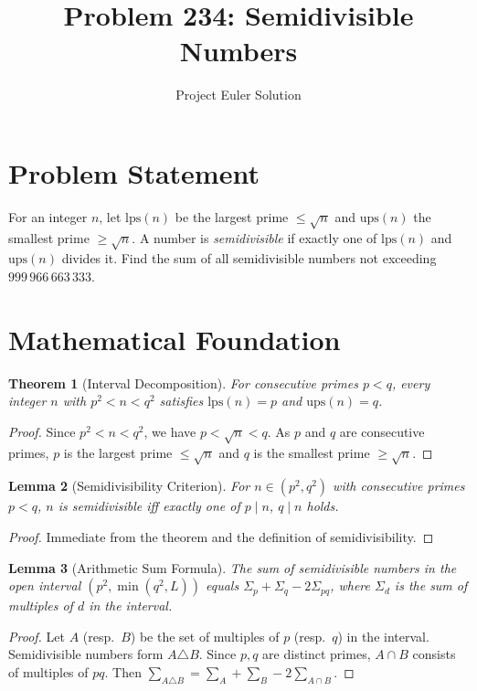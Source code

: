 \documentclass[12pt]{article}
\title{Problem 234: Semidivisible Numbers}
\author{Project Euler Solution}
\date{}
\newtheorem{theorem}{Theorem}
\newtheorem{lemma}[theorem]{Lemma}
\begin{document}
\maketitle

\section{Problem Statement}
For an integer $n$, let $\mathrm{lps}(n)$ be the largest prime $\leq \sqrt{n}$ and $\mathrm{ups}(n)$ the smallest prime $\geq \sqrt{n}$. A number is \emph{semidivisible} if exactly one of $\mathrm{lps}(n)$ and $\mathrm{ups}(n)$ divides it. Find the sum of all semidivisible numbers not exceeding $999\,966\,663\,333$.

\section{Mathematical Foundation}

\begin{theorem}[Interval Decomposition]
For consecutive primes $p < q$, every integer $n$ with $p^2 < n < q^2$ satisfies $\mathrm{lps}(n) = p$ and $\mathrm{ups}(n) = q$.
\end{theorem}

\begin{proof}
Since $p^2 < n < q^2$, we have $p < \sqrt{n} < q$. As $p$ and $q$ are consecutive primes, $p$ is the largest prime $\leq \sqrt{n}$ and $q$ is the smallest prime $\geq \sqrt{n}$.
\end{proof}

\begin{lemma}[Semidivisibility Criterion]
For $n \in (p^2, q^2)$ with consecutive primes $p < q$, $n$ is semidivisible iff exactly one of $p \mid n$, $q \mid n$ holds.
\end{lemma}

\begin{proof}
Immediate from the theorem and the definition of semidivisibility.
\end{proof}

\begin{lemma}[Arithmetic Sum Formula]
The sum of semidivisible numbers in the open interval $(p^2, \min(q^2, L))$ equals $\Sigma_p + \Sigma_q - 2\Sigma_{pq}$, where $\Sigma_d$ is the sum of multiples of $d$ in the interval.
\end{lemma}

\begin{proof}
Let $A$ (resp.\ $B$) be the set of multiples of $p$ (resp.\ $q$) in the interval. Semidivisible numbers form $A \triangle B$. Since $p,q$ are distinct primes, $A \cap B$ consists of multiples of $pq$. Then $\sum_{A \triangle B} = \sum_A + \sum_B - 2\sum_{A \cap B}$.
\end{proof}
\end{document}
